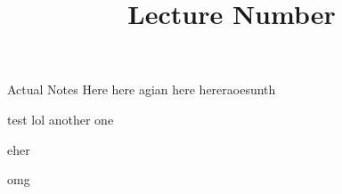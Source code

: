 \documentclass[20pt]{extarticle}
\title{Lecture Number}
\begin{document}
\maketitle

Actual Notes Here
here agian
here
hereraoesunth

\newpage
test
lol
\newpage
another one

eher

\newpage

omg
\end{document}
